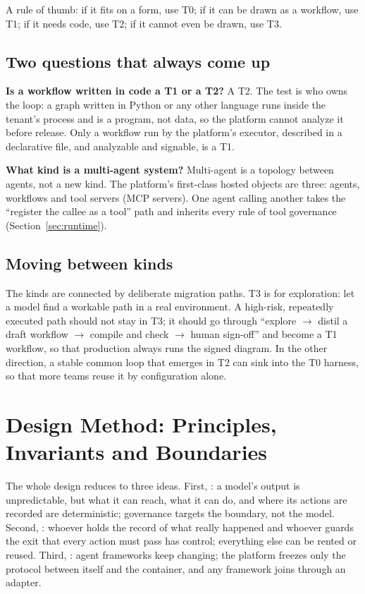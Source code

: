 A rule of thumb: if it fits on a form, use T0; if it can be drawn as a workflow, use T1; if it needs code, use T2; if it cannot even be drawn, use T3.

\subsection{Two questions that always come up}

\textbf{Is a workflow written in code a T1 or a T2?} A T2. The test is who owns the loop: a graph written in Python or any other language runs inside the tenant's process and is a program, not data, so the platform cannot analyze it before release. Only a workflow run by the platform's executor, described in a declarative file, and analyzable and signable, is a T1.

\textbf{What kind is a multi-agent system?} Multi-agent is a topology between agents, not a new kind. The platform's first-class hosted objects are three: agents, workflows and tool servers (MCP servers). One agent calling another takes the ``register the callee as a tool'' path and inherits every rule of tool governance (Section~\ref{sec:runtime}).

\subsection{Moving between kinds}

The kinds are connected by deliberate migration paths. T3 is for exploration: let a model find a workable path in a real environment. A high-risk, repeatedly executed path should not stay in T3; it should go through ``explore $\rightarrow$ distil a draft workflow $\rightarrow$ compile and check $\rightarrow$ human sign-off'' and become a T1 workflow, so that production always runs the signed diagram. In the other direction, a stable common loop that emerges in T2 can sink into the T0 harness, so that more teams reuse it by configuration alone.

\section{Design Method: Principles, Invariants and Boundaries}
\label{sec:method}

The whole design reduces to three ideas. First, : a model's output is unpredictable, but what it can reach, what it can do, and where its actions are recorded are deterministic; governance targets the boundary, not the model. Second, : whoever holds the record of what really happened and whoever guards the exit that every action must pass has control; everything else can be rented or reused. Third, : agent frameworks keep changing; the platform freezes only the protocol between itself and the container, and any framework joins through an adapter.

